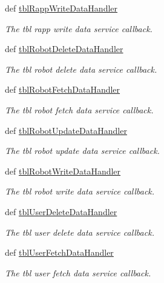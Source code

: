 \begin{DoxyCompactItemize}
def \hyperlink{classmysql__wrapper_1_1MySQLdbWrapper_a2c723a207416e2a9eafb724c36a14ba6}{tbl\-Rapp\-Write\-Data\-Handler}
\begin{DoxyCompactList}\small\item\em The tbl rapp write data service callback. \end{DoxyCompactList}\item 
def \hyperlink{classmysql__wrapper_1_1MySQLdbWrapper_a3c949c2a96cdc31d8cbdac2bd9ef3ac7}{tbl\-Robot\-Delete\-Data\-Handler}
\begin{DoxyCompactList}\small\item\em The tbl robot delete data service callback. \end{DoxyCompactList}\item 
def \hyperlink{classmysql__wrapper_1_1MySQLdbWrapper_a512b16b54d172776f540e7203bbda2c7}{tbl\-Robot\-Fetch\-Data\-Handler}
\begin{DoxyCompactList}\small\item\em The tbl robot fetch data service callback. \end{DoxyCompactList}\item 
def \hyperlink{classmysql__wrapper_1_1MySQLdbWrapper_a23ca61008cea74ff35bd85338ccfc1ff}{tbl\-Robot\-Update\-Data\-Handler}
\begin{DoxyCompactList}\small\item\em The tbl robot update data service callback. \end{DoxyCompactList}\item 
def \hyperlink{classmysql__wrapper_1_1MySQLdbWrapper_aa21b0b01a7d1ec98073156a042735e64}{tbl\-Robot\-Write\-Data\-Handler}
\begin{DoxyCompactList}\small\item\em The tbl robot write data service callback. \end{DoxyCompactList}\item 
def \hyperlink{classmysql__wrapper_1_1MySQLdbWrapper_aa6937a53020bce76736b1b9a3678b300}{tbl\-User\-Delete\-Data\-Handler}
\begin{DoxyCompactList}\small\item\em The tbl user delete data service callback. \end{DoxyCompactList}\item 
def \hyperlink{classmysql__wrapper_1_1MySQLdbWrapper_aa22e6f68fdb2816c74d6b2dc9c96220f}{tbl\-User\-Fetch\-Data\-Handler}
\begin{DoxyCompactList}\small\item\em The tbl user fetch data service callback. \end{DoxyCompactList}\item 

\end{DoxyCompactItemize}
